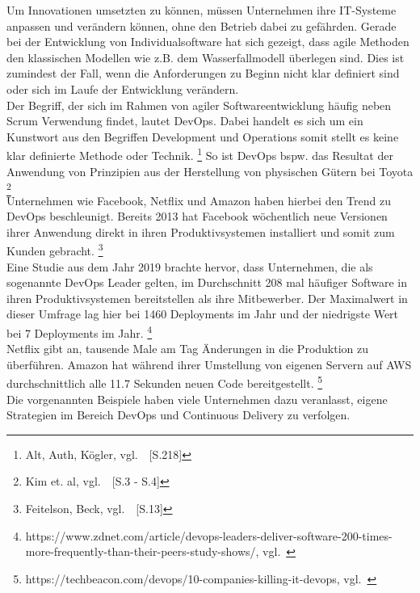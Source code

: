 Um Innovationen umsetzten zu können, müssen Unternehmen ihre IT-Systeme anpassen und verändern können, ohne den Betrieb dabei zu gefährden.
Gerade bei der Entwicklung von Individualsoftware hat sich gezeigt, dass agile Methoden den klassischen Modellen wie z.B. dem Wasserfallmodell überlegen sind.
Dies ist zumindest der Fall, wenn die Anforderungen zu Beginn nicht klar definiert sind oder sich im Laufe der Entwicklung verändern. \\

Der Begriff, der sich im Rahmen von agiler Softwareentwicklung häufig neben Scrum Verwendung findet, lautet DevOps.
Dabei handelt es sich um ein Kunstwort aus den Begriffen Development und Operations somit stellt es keine klar definierte Methode oder Technik. \footnote{Alt, Auth, Kögler, vgl.~\cite{Alt2017}~[S.218]}
So ist DevOps bspw. das Resultat der Anwendung von Prinzipien aus der Herstellung von physischen Gütern bei Toyota \footnote{Kim et. al, vgl.~\cite{Kim2018}~[S.3 - S.4]} \\

Unternehmen wie Facebook, Netflix und Amazon haben hierbei den Trend zu DevOps beschleunigt.
Bereits 2013 hat Facebook wöchentlich neue Versionen ihrer Anwendung direkt in ihren Produktivsystemen installiert und somit zum Kunden gebracht. \footnote{Feitelson, Beck, vgl.~\cite{Feitelson2013}~[S.13]} \\

Eine Studie aus dem Jahr 2019 brachte hervor, dass Unternehmen, die als sogenannte DevOps Leader gelten, im Durchschnitt 208 mal häufiger Software in ihren Produktivsystemen bereitstellen als ihre Mitbewerber.
Der Maximalwert in dieser Umfrage lag hier bei 1460 Deployments im Jahr und der niedrigste Wert bei 7 Deployments im Jahr.
\footnote{https://www.zdnet.com/article/devops-leaders-deliver-software-200-times-more-frequently-than-their-peers-study-shows/, vgl.~\cite{ZDNET_DEVOPS}} \\

Netflix gibt an, tausende Male am Tag Änderungen in die Produktion zu überführen.
Amazon hat während ihrer Umstellung von eigenen Servern auf AWS durchschnittlich alle 11.7 Sekunden neuen Code bereitgestellt.
\footnote{https://techbeacon.com/devops/10-companies-killing-it-devops, vgl.~\cite{TECHBEACON}} \\

Die vorgenannten Beispiele haben viele Unternehmen dazu veranlasst, eigene Strategien im Bereich DevOps und Continuous Delivery zu verfolgen.